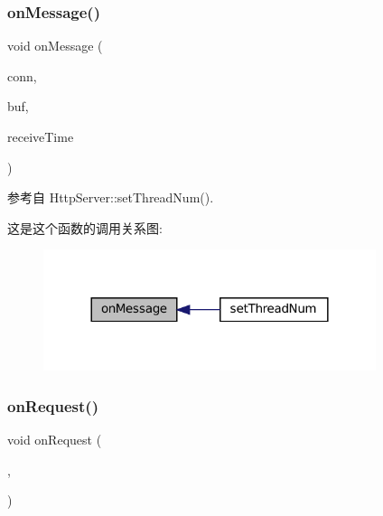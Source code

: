 \subsubsection{\texorpdfstring{on\+Message()}{onMessage()}}
{\footnotesize\ttfamily void on\+Message (\begin{DoxyParamCaption}\item[{const \hyperlink{namespacemuduo_1_1net_ab91a46e9290926aa692450e46cfc9039}{Tcp\+Connection\+Ptr} \&}]{conn,  }\item[{\hyperlink{classmuduo_1_1net_1_1Buffer}{Buffer} $\ast$}]{buf,  }\item[{\hyperlink{classmuduo_1_1Timestamp}{Timestamp}}]{receive\+Time }\end{DoxyParamCaption})\hspace{0.3cm}{\ttfamily [private]}}



参考自 Http\+Server\+::set\+Thread\+Num().

这是这个函数的调用关系图\+:
\nopagebreak
\begin{figure}[H]
\begin{center}
\leavevmode
\includegraphics[width=276pt]{classmuduo_1_1net_1_1HttpServer_affde82cb1aeae31f8ce39103fa4cd358_icgraph}
\end{center}
\end{figure}
\mbox{\label{classmuduo_1_1net_1_1HttpServer_a39f88c74f26fed6e5d98de09075f4c1b}} 
\subsubsection{\texorpdfstring{on\+Request()}{onRequest()}}
{\footnotesize\ttfamily void on\+Request (\begin{DoxyParamCaption}\item[{const \hyperlink{namespacemuduo_1_1net_ab91a46e9290926aa692450e46cfc9039}{Tcp\+Connection\+Ptr} \&}]{,  }\item[{const \hyperlink{classmuduo_1_1net_1_1HttpRequest}{Http\+Request} \&}]{ }\end{DoxyParamCaption})\hspace{0.3cm}{\ttfamily [private]}}



